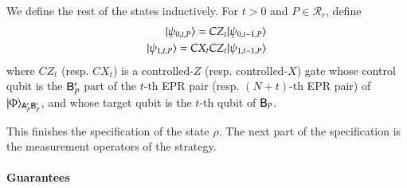 We define the rest of the states inductively. For $t > 0$ and $P \in \mathcal{R}_r$, define
\begin{align}
	|\psi_{0,t,P}\rangle = CZ_t |\psi_{0,t-1,P}\rangle \\
	|\psi_{1,t,P}\rangle = CX_t CZ_t |\psi_{1,t-1,P}\rangle
\end{align}
 
where $CZ_t$ (resp. $CX_t$) is a controlled-$Z$ (resp. controlled-$X$) gate whose control qubit is the ${\mathsf{B}}_P'$ part of the $t$-th EPR pair (resp. $(N+t)$-th EPR pair) of $|\Phi\rangle_{{\mathsf{A}}_P' {\mathsf{B}}_P'}$, and whose target qubit is the $t$-th qubit of ${\mathsf{B}}_P$. 


This finishes the specification of the state $\rho$. The next part of the specification is the measurement operators of the strategy. 


\paragraph{Guarantees}



